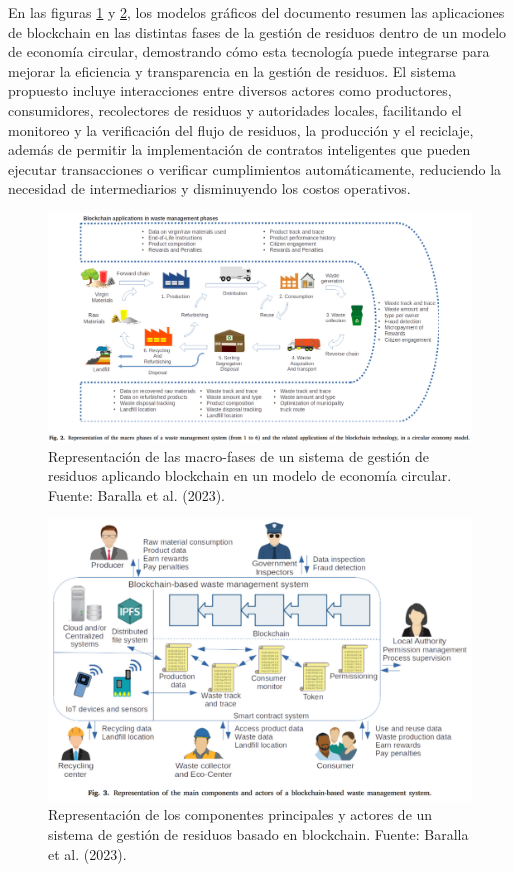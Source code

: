 \documentclass[main.tex]{subfiles}
\begin{document}
En las figuras \ref{fig:baralla-1} y \ref{fig:baralla-2}, los modelos gráficos del documento resumen las aplicaciones de blockchain en las distintas fases de la gestión de residuos dentro de un modelo de economía circular, demostrando cómo esta tecnología puede integrarse para mejorar la eficiencia y transparencia en la gestión de residuos. El sistema propuesto incluye interacciones entre diversos actores como productores, consumidores, recolectores de residuos y autoridades locales, facilitando el monitoreo y la verificación del flujo de residuos, la producción y el reciclaje, además de permitir la implementación de contratos inteligentes que pueden ejecutar transacciones o verificar cumplimientos automáticamente, reduciendo la necesidad de intermediarios y disminuyendo los costos operativos.

\begin{figure}[h]
	\centering
	\includegraphics[width=1\textwidth]{./assets/baralla-model-1.png}
	\caption{Representación de las macro-fases de un sistema de gestión de residuos aplicando blockchain en un modelo de economía circular. Fuente: Baralla et al. (2023).}
	\label{fig:baralla-1}
\end{figure}

\begin{figure}[h]
	\centering
	\includegraphics[width=1\textwidth]{./assets/baralla-model-2.png}
	\caption{Representación de los componentes principales y actores de un sistema de gestión de residuos basado en blockchain. Fuente: Baralla et al. (2023).}
	\label{fig:baralla-2}
\end{figure}
\end{document}
